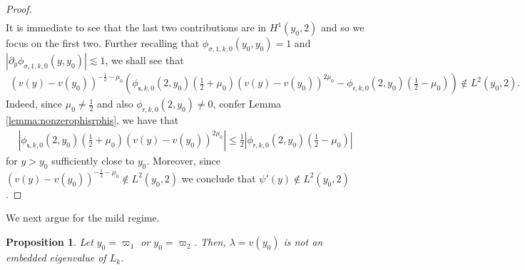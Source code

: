 \documentclass[11pt,reqno]{amsproc}
\newtheorem{proposition}{Proposition}[section]
\theoremstyle{definition}
\numberwithin{equation}{section}
\newcommand{\sr}{{\mathsf{r}}}
\newcommand{\s}{{\mathsf{s}}}
\begin{document}
\begin{proof}
\begin{align*}
\end{align*}
It is immediate to see that the last two contributions are in $H^1(y_0,2)$ and so we focus on the first two. Further recalling that $\phi_{\sigma,1,k,0}(y_0,y_0)=1$ and $\left| \partial_y \phi_{\sigma,1,k,0}(y,y_0) \right| \lesssim 1$, we shall see that 
\begin{align*}
    (v(y) - v(y_0))^{-\frac12-\mu_0} \left( \phi_{\s,k,0}(2,y_0) \left(\frac12+\mu_0 \right)(v(y) - v(y_0))^{2\mu_0} - \phi_{\sr,k,0}(2,y_0) \left(\frac12-\mu_0 \right)\right)\not \in L^2(y_0,2).
\end{align*}
Indeed, since $\mu_0\neq\frac12$ and also $\phi_{\sr,k,0}(2,y_0)\neq 0$, confer Lemma \ref{lemma:nonzerophisrphis}, we have that
\begin{align}
    \left| \phi_{\s,k,0}(2,y_0) \left(\frac12+\mu_0 \right)(v(y) - v(y_0))^{2\mu_0} \right| \leq \frac12 \left| \phi_{\sr,k,0}(2,y_0) \left(\frac12-\mu_0 \right) \right|
\end{align}
for $y>y_0$ sufficiently close to $y_0$. Moreover, since $(v(y) - v(y_0))^{-\frac12-\mu_0}\not \in L^2(y_0,2)$ we conclude that $\psi'(y)\not \in L^2(y_0,2)$.
\end{proof}

We next argue for the mild regime.

\begin{proposition}\label{prop:noembedmild}
Let $y_0=\varpi_1$ or $y_0=\varpi_2$. Then, $\lambda= v(y_0)$ is not an embedded eigenvalue of $L_k$.
\end{proposition}
\end{document}
